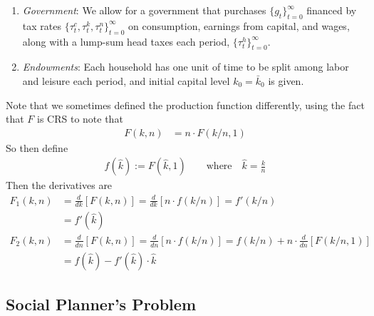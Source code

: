 \documentclass[12pt]{article}
\theoremstyle{plain}
\theoremstyle{definition}
\theoremstyle{remark}
\newcommand{\tinfz}{^\infty_{t=0}}
\begin{document}
\begin{enumerate}
  \item \emph{Government}:
    We allow for a government that purchases $\{g_t\}\tinfz$ financed by
    tax rates $\{\tau_t^c,\tau_t^k,\tau_t^n\}\tinfz$ on consumption,
    earnings from capital, and wages, along with a lump-sum head taxes
    each period, $\{\tau^h_t\}\tinfz$.

  \item \emph{Endowments}:
    Each household has one unit of time to be split among labor and
    leisure each period, and initial capital level $k_0=\bar{k}_0$ is
    given.
\end{enumerate}
Note that we sometimes defined the production function differently,
using the fact that $F$ is CRS to note that
\begin{align*}
  F(k,n) &= n \cdot F(k/n,1)
\end{align*}
So then define
\begin{align*}
  f(\hat{k}) := F(\hat{k},1)
  \qquad\text{where}\quad
  \hat{k} = \frac{k}{n}
\end{align*}
Then the derivatives are
\begin{align*}
  F_1(k,n)
  &=
  \frac{d}{dk}[F(k,n)]
  =
  \frac{d}{dk}[n\cdot f(k/n)]
  = f'(k/n) \\
  &= f'(\hat{k}) \\
  F_2(k,n)
  &=
  \frac{d}{dn}[F(k,n)]
  =
  \frac{d}{dn}[n\cdot f(k/n)]
  = f(k/n) +
  n\cdot
  \frac{d}{dn}[F(k/n,1)] \\
  &= f(\hat{k}) - f'(\hat{k})\cdot \hat{k}
\end{align*}


\clearpage
\subsection{Social Planner's Problem}
\end{document}
